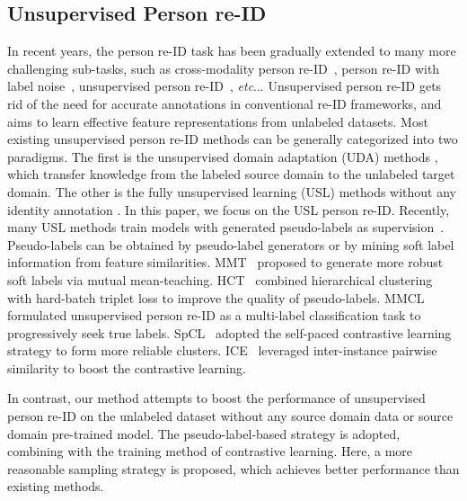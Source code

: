 \documentclass[lettersize,journal]{IEEEtran}
\makeatletter
\DeclareRobustCommand\onedot{\futurelet\@let@token\@onedot}
\def\@onedot{\ifx\@let@token.\else.\null\fi\xspace}
\def\etc{\emph{etc}\onedot} \def\vs{\emph{vs}\onedot}
\makeatother
\begin{document}
\subsection{Unsupervised Person re-ID}
In recent years, the person re-ID task has been gradually extended to many more challenging sub-tasks, such as cross-modality person re-ID~\cite{crossmodality1,crossmodality2,reid-survey1,crossmodality3}, person re-ID with label noise~\cite{lablenoise1,lablenoise2}, unsupervised person re-ID~\cite{PTGAN,eSPGAN,HHL,MEB,CR-GAN,MMT,Ad-cluster,JVCT,zj1,DG-Net++,tip-uda1,tip-uda2,tip-uda3,tip-uda4,tip-uda5,SSG,MAR,BUC,DBC,tip-u2,tip-u1,SSL,MMCL,HCT,SpCL,DSCE,GCL,CycAs,CAP,IICS,MPRD,ICE,HCD,LOMO,Market,OIM}, \etc.
Unsupervised person re-ID gets rid of the need for accurate annotations in conventional re-ID frameworks, and aims to learn effective feature representations from unlabeled datasets. Most existing unsupervised person re-ID methods can be generally categorized into two paradigms.
The first is the unsupervised domain adaptation (UDA) methods \cite{PTGAN,eSPGAN,HHL,SSG,MAR,MEB,CR-GAN,MMT,Ad-cluster,JVCT,zj1,DG-Net++,tip-uda1,tip-uda2,tip-uda3,tip-uda4,tip-uda5,GCL,HCD}, which transfer knowledge from the labeled source domain to the unlabeled target domain.
The other is the fully unsupervised learning (USL) methods without any identity annotation \cite{LOMO,Market,OIM,BUC,DBC,tip-u2,tip-u1,SSL,MMCL,HCT,CycAs,SpCL,CAP,DSCE,IICS,MPRD,ICE}.
In this paper, we focus on the USL person re-ID.
Recently, many USL methods train models with generated pseudo-labels as supervision~\cite{HCT,MMCL,SpCL,CAP,ICE,DSCE,IICS}. Pseudo-labels can be obtained by pseudo-label generators or by mining soft label information from feature similarities.
MMT~\cite{MMT} proposed to generate more robust soft labels via mutual mean-teaching.
HCT~\cite{HCT} combined hierarchical clustering with hard-batch triplet loss to improve the quality of pseudo-labels.
MMCL~\cite{MMCL} formulated unsupervised person re-ID as a multi-label classification task to progressively seek true labels.
SpCL~\cite{SpCL} adopted the self-paced contrastive learning strategy to form more reliable clusters.
ICE~\cite{ICE} leveraged inter-instance pairwise similarity to boost the contrastive learning.

In contrast, our method attempts to boost the performance of unsupervised person re-ID on the unlabeled dataset without any source domain data or source domain pre-trained model. The pseudo-label-based strategy is adopted, combining with the training method of contrastive learning. Here, a more reasonable sampling strategy is proposed, which achieves better performance than existing methods.
\end{document}
